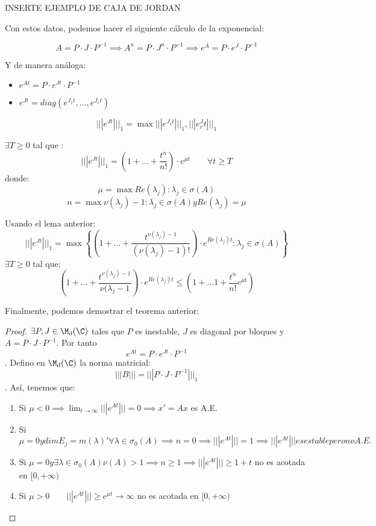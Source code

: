 INSERTE EJEMPLO DE CAJA DE JORDAN

Con estos datos, podemos hacer el siguiente cálculo de la exponencial:

$$A=P\cdot J \cdot P^{-1} \implies A^n=P \cdot J^n \cdot P^{-1} \implies e^A=P \cdot e^J \cdot P^{-1}$$

Y de manera análoga:
\begin{itemize}
\item $e^{At}=P \cdot e^{Jt} \cdot P^{-1}$
\item $e^{Jt}=diag(e^{J_1t},...,e^{J_rt} )$
\end{itemize}


\begin{lema}
$$|||e^{Jt}|||_1=\max{|||e^{J_1t}|||_1,|||e^J_rt|||_1}$$
\end{lema}

\begin{lema}
$\exists T \geq 0 $ tal que :
$$|||e^{Jt}|||_1=\left(1+...+\frac{t^n}{n!}\right)\cdot e^{\mu t} \qquad \forall t \geq T$$
donde:
$$\mu=\max{Re(\lambda_j):\lambda_j\in \sigma(A)}$$
$$n=\max{\nu(\lambda_j)-1 : \lambda_j\in \sigma(A) y Re(\lambda_j)=\mu}$$
\end{lema}

Usando el lema anterior:
\begin{equation}
|||e^{Jt}|||_1=\max
\left\{ {\left(
1+...+\frac{t^{\nu(\lambda_j)-1}}{(\nu (\lambda_j)-1)!}
\right) }
\cdot e^{Re(\lambda_j)t} : \lambda_j \in \sigma(A) \right\}
\tag{cosarara}\label{cosarara}
\end{equation}
$\exists T \geq 0$ tal que:
\begin{equation}
(1+...+\frac{t^{\nu(\lambda_j)-1}}{\nu(\lambda_j - 1})\cdot e^{Re(\lambda_j)t} \leq (1+...1+\frac{t^n}{n!}e^{\mu t})
\end{equation}

Finalmente, podemos demostrar el teorema anterior:

\begin{proof}
$\exists P, J \in \M_d(\C)$ tales que $P$ es inestable, $J$ es diagonal por bloques y $A=P\cdot J \cdot P^{-1}$. Por tanto $$e^{At}=P\cdot e^{Jt} \cdot P^{-1}$$.
Defino en $\M_d(\C)$ la norma matricial:
$$|||B|||=|||P\cdot J \cdot P^{-1}|||_1$$.
Así, tenemos que:
\begin{enumerate}
\item Si $\mu < 0 \implies \lim_{t\to\infty}|||e^{At}|||=0\implies x'=Ax$ es A.E.
\item Si $\mu = 0 y dimE_j=m(\lambda)' \forall \lambda \in \sigma_0(A)\implies n=0 \implies |||e^{At}|||=1\implies|||e^{At}||| es estable pero no A.E.$
\item Si $\mu = 0 y \exists \lambda \in \sigma_0(A) \nu(A)>1 \implies n\geq 1\implies |||e^{At}|||\geq 1+t$ no es acotada en $[0,+\infty)$
\item Si $\mu > 0 \qquad |||e^{At}|||\geq e^{\mu t}\to \infty$ no es acotada en $[0,+\infty)$
\end{enumerate}
\end{proof}


